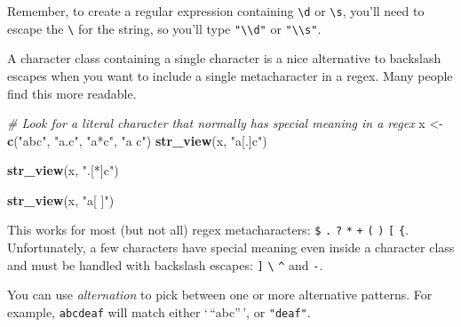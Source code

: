 \documentclass[]{book}
\newenvironment{Shaded}{\begin{snugshade}}{\end{snugshade}}
\newcommand{\CommentTok}[1]{\textcolor[rgb]{0.56,0.35,0.01}{\textit{#1}}}
\newcommand{\KeywordTok}[1]{\textcolor[rgb]{0.13,0.29,0.53}{\textbf{#1}}}
\newcommand{\NormalTok}[1]{#1}
\newcommand{\StringTok}[1]{\textcolor[rgb]{0.31,0.60,0.02}{#1}}
\begin{document}
Remember, to create a regular expression containing \texttt{\textbackslash{}d} or \texttt{\textbackslash{}s}, you'll need to escape the \texttt{\textbackslash{}} for the string, so you'll type \texttt{"\textbackslash{}\textbackslash{}d"} or \texttt{"\textbackslash{}\textbackslash{}s"}.

A character class containing a single character is a nice alternative to backslash escapes when you want to include a single metacharacter in a regex. Many people find this more readable.

\begin{Shaded}
\begin{Highlighting}[]
\CommentTok{# Look for a literal character that normally has special meaning in a regex}
\NormalTok{x <-}\StringTok{ }\KeywordTok{c}\NormalTok{(}\StringTok{"abc"}\NormalTok{, }\StringTok{"a.c"}\NormalTok{, }\StringTok{"a*c"}\NormalTok{, }\StringTok{"a c"}\NormalTok{)}
\KeywordTok{str_view}\NormalTok{(x, }\StringTok{"a[.]c"}\NormalTok{)}
\end{Highlighting}
\end{Shaded}

\hypertarget{htmlwidget-4018eef1a407a0df6b52}{}

\begin{Shaded}
\begin{Highlighting}[]
\KeywordTok{str_view}\NormalTok{(x, }\StringTok{".[*]c"}\NormalTok{)}
\end{Highlighting}
\end{Shaded}

\hypertarget{htmlwidget-5b1b2f4ad92281566982}{}

\begin{Shaded}
\begin{Highlighting}[]
\KeywordTok{str_view}\NormalTok{(x, }\StringTok{"a[ ]"}\NormalTok{)}
\end{Highlighting}
\end{Shaded}

\hypertarget{htmlwidget-25c3e940e6859592f801}{}

This works for most (but not all) regex metacharacters: \texttt{\$} \texttt{.} \texttt{\textbar{}} \texttt{?} \texttt{*} \texttt{+} \texttt{(} \texttt{)} \texttt{{[}} \texttt{\{}. Unfortunately, a few characters have special meaning even inside a character class and must be handled with backslash escapes: \texttt{{]}} \texttt{\textbackslash{}} \texttt{\^{}} and \texttt{-}.

You can use \emph{alternation} to pick between one or more alternative patterns. For example, \texttt{abc\textbar{}deaf} will match either `\,``abc''\,', or \texttt{"deaf"}.
\end{document}
